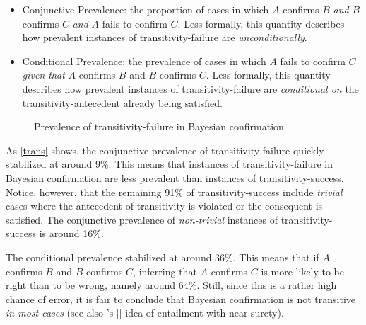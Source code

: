 \documentclass[a4paper,11pt]{article}
\begin{document}
\begin{itemize}
\item Conjunctive Prevalence: the proportion of cases in which $A$ confirms $B$ \emph{and} $B$ confirms $C$ \emph{and} $A$ fails to confirm $C$. Less formally, this quantity describes how prevalent instances of transitivity-failure are \emph{unconditionally}.

\item Conditional Prevalence: the prevalence of cases in which $A$ fails to confirm $C$ \emph{given that} $A$ confirms $B$ and $B$ confirms $C$. Less formally, this quantity describes how prevalent instances of transitivity-failure are \emph{conditional on} the transitivity-antecedent already being satisfied.
\end{itemize}

\begin{figure}[t]
\centering
{}
\caption{Prevalence of transitivity-failure in Bayesian confirmation.}
\label{trans}
\end{figure}

\noindent As \autoref{trans} shows, the conjunctive prevalence of transitivity-failure quickly stabilized at around 9\%. This means that instances of transitivity-failure in Bayesian confirmation are less prevalent than instances of transi\-tivity-success. Notice, however, that the remaining 91\% of transitivity-success include \emph{trivial} cases where the antecedent of transitivity is violated or the consequent is satisfied. The conjunctive prevalence of \emph{non-trivial} instances of transitivity-success is around 16\%. 

The conditional prevalence stabilized at around 36\%. This means that if $A$ confirms $B$ and $B$ confirms $C$, inferring that $A$ confirms $C$ is more likely to be right than to be wrong, namely around 64\%. Still, since this is a rather high chance of error, it is fair to conclude that Bayesian confirmation is not transitive \emph{in most cases} (see also \citeauthor{Bamber2000}'s [\citeyear{Bamber2000}] idea of entailment with near surety).
\end{document}
